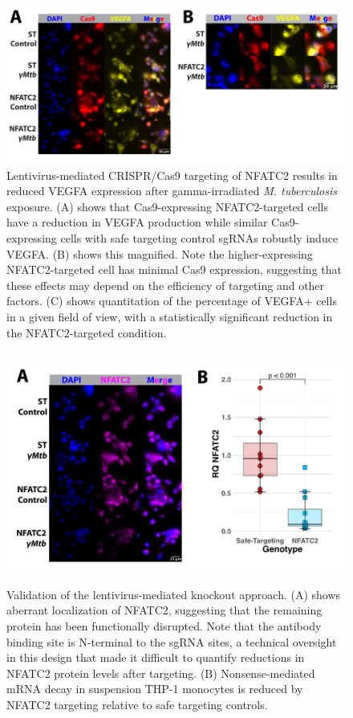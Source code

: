 \begin{figure}
\centering
\includegraphics[width=\textwidth]{images/lentiIF.pdf}
\caption{Lentivirus\hyp{}mediated CRISPR/Cas9 targeting of NFATC2 results in reduced VEGFA expression after gamma\hyp{}irradiated \textit{M. tuberculosis} exposure. (A) shows that Cas9\hyp{}expressing NFATC2\hyp{}targeted cells have a reduction in VEGFA production while similar Cas9\hyp{}expressing cells with safe targeting control sgRNAs robustly induce VEGFA. (B) shows this magnified. Note the higher\hyp{}expressing NFATC2\hyp{}targeted cell has minimal Cas9 expression, suggesting that these effects may depend on the efficiency of targeting and other factors. (C) shows quantitation of the percentage of VEGFA+ cells in a given field of view, with a statistically significant reduction in the NFATC2\hyp{}targeted condition.}
\label{figure:lenti}
\end{figure}

\begin{figure}
\centering
\includegraphics[height=3in]{images/lentivalid.pdf}
\caption{Validation of the lentivirus\hyp{}mediated knockout approach. (A) shows aberrant localization of NFATC2, suggesting that the remaining protein has been functionally disrupted. Note that the antibody binding site is N\hyp{}terminal to the sgRNA sites, a technical oversight in this design that made it difficult to quantify reductions in NFATC2 protein levels after targeting. (B) Nonsense\hyp{}mediated mRNA decay in suspension THP\hyp{}1 monocytes is reduced by NFATC2 targeting relative to safe targeting controls.}
\label{figure:validation}
\end{figure}

